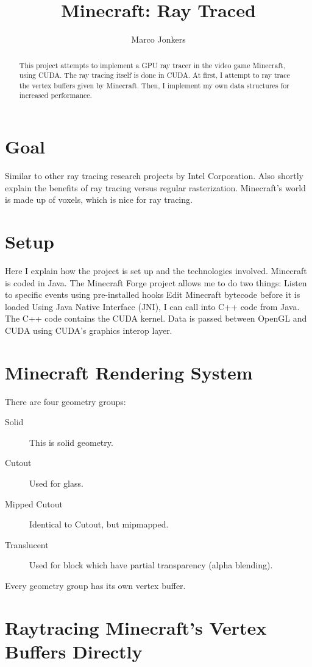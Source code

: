 \documentclass[]{article}
\title{Minecraft: Ray Traced}
\author{Marco Jonkers}
\begin{document}
\maketitle

\begin{abstract}
This project attempts to implement a GPU ray tracer in the video game Minecraft, using CUDA.
The ray tracing itself is done in CUDA. At first, I attempt to ray trace the vertex buffers given by Minecraft. Then, I implement my own data structures for increased performance.
\end{abstract}

\section{Goal}
Similar to other ray tracing research projects by Intel Corporation.
Also shortly explain the benefits of ray tracing versus regular rasterization.
Minecraft's world is made up of voxels, which is nice for ray tracing.

\section{Setup}
Here I explain how the project is set up and the technologies involved.
Minecraft is coded in Java.
The Minecraft Forge project allows me to do two things:
  Listen to specific events using pre-installed hooks
  Edit Minecraft bytecode before it is loaded
Using Java Native Interface (JNI), I can call into C++ code from Java.
The C++ code contains the CUDA kernel.
Data is passed between OpenGL and CUDA using CUDA's graphics interop layer.

\section{Minecraft Rendering System}
There are four geometry groups:
\begin{description}
  \item[Solid] This is solid geometry.
  \item[Cutout] Used for glass.
  \item[Mipped Cutout] Identical to Cutout, but mipmapped.
  \item[Translucent] Used for block which have partial transparency (alpha blending).
\end{description}
Every geometry group has its own vertex buffer.

\section{Raytracing Minecraft's Vertex Buffers Directly}
\end{document}
